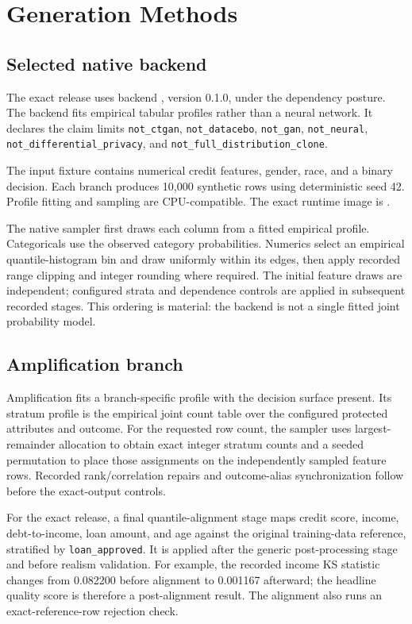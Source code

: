 \section{Generation Methods}

\subsection{Selected native backend}

The exact release uses backend , version 0.1.0, under the
 dependency posture. The backend fits empirical tabular profiles
rather than a neural network. It declares the claim limits \texttt{not\_ctgan},
\texttt{not\_datacebo}, \texttt{not\_gan}, \texttt{not\_neural},
\texttt{not\_differential\_privacy}, and \texttt{not\_full\_distribution\_clone}.

The input fixture contains numerical credit features, gender, race, and a binary decision. Each
branch produces 10,000 synthetic rows using deterministic seed 42. Profile fitting and sampling are
CPU-compatible. The exact runtime image is \IdentityText{\RuntimeImageDigestRaw}.

The native sampler first draws each column from a fitted empirical profile. Categoricals use the
observed category probabilities. Numerics select an empirical quantile-histogram bin and draw
uniformly within its edges, then apply recorded range clipping and integer rounding where required.
The initial feature draws are independent; configured strata and dependence controls are applied in
subsequent recorded stages. This ordering is material: the backend is not a single fitted joint
probability model.

\subsection{Amplification branch}

Amplification fits a branch-specific profile with the decision surface present. Its stratum profile
is the empirical joint count table over the configured protected attributes and outcome. For the
requested row count, the sampler uses largest-remainder allocation to obtain exact integer stratum
counts and a seeded permutation to place those assignments on the independently sampled feature
rows. Recorded rank/correlation repairs and outcome-alias synchronization follow before the
exact-output controls.

For the exact release, a final quantile-alignment stage maps credit score, income,
debt-to-income, loan amount, and age against the original training-data reference, stratified by
\texttt{loan\_approved}. It is applied after the generic post-processing stage and before realism
validation. For example, the recorded income KS statistic changes from 0.082200 before alignment to
0.001167 afterward; the headline quality score is therefore a post-alignment result. The alignment
also runs an exact-reference-row rejection check.

